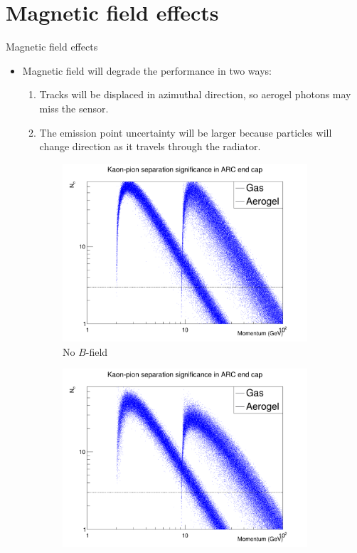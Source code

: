 \documentclass{beamer}
\begin{document}
\section{Magnetic field effects}
\begin{frame}{Magnetic field effects}
  \begin{itemize}
    \item{Magnetic field will degrade the performance in two ways:}
    \begin{enumerate}
      \item{Tracks will be displaced in azimuthal direction, so aerogel photons may miss the sensor.}
      \item{The emission point uncertainty will be larger because particles will change direction as it travels through the radiator.}
    \end{enumerate}
  \end{itemize}
  \begin{figure}
    \centering
    \begin{subfigure}{0.33\textwidth}
      \includegraphics[width = 1.0\textwidth]{Plots/Significance_Scatter_PionKaon_Barrel_MagOff.png}
      \caption{No $B$-field}
    \end{subfigure}%
    \begin{subfigure}{0.33\textwidth}
      \includegraphics[width = 1.0\textwidth]{Plots/Significance_Scatter_PionKaon_Barrel_MagOn.png}

\end{subfigure}
\end{figure}
\end{frame}
\end{document}
